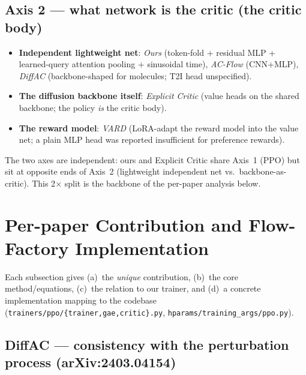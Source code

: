 \documentclass[11pt]{article}
\theoremstyle{remark}
\begin{document}
\subsection{Axis 2 --- what network is the critic (the critic body)}
\begin{itemize}[leftmargin=1.6em]
  \item \textbf{Independent lightweight net}: \emph{Ours} (token-fold + residual MLP +
  learned-query attention pooling + sinusoidal time), \emph{AC-Flow} (CNN+MLP),
  \emph{DiffAC} (backbone-shaped for molecules; T2I head unspecified).
  \item \textbf{The diffusion backbone itself}: \emph{Explicit Critic} (value heads on
  the shared backbone; the policy \emph{is} the critic body).
  \item \textbf{The reward model}: \emph{VARD} (LoRA-adapt the reward model into the
  value net; a plain MLP head was reported insufficient for preference rewards).
\end{itemize}

The two axes are independent: ours and Explicit Critic share Axis~1 (PPO) but sit at
opposite ends of Axis~2 (lightweight independent net vs.\ backbone-as-critic). This
2$\times$ split is the backbone of the per-paper analysis below.

\section{Per-paper Contribution and Flow-Factory Implementation}
\label{sec:papers}

Each subsection gives (a)~the \emph{unique} contribution, (b)~the core method/equations,
(c)~the relation to our trainer, and (d)~a concrete implementation mapping to the
codebase (\texttt{trainers/ppo/\{trainer,gae,critic\}.py},
\texttt{hparams/training\_args/ppo.py}).

\subsection{DiffAC --- consistency with the perturbation process (arXiv:2403.04154)}
\label{sec:diffac}
\end{document}
